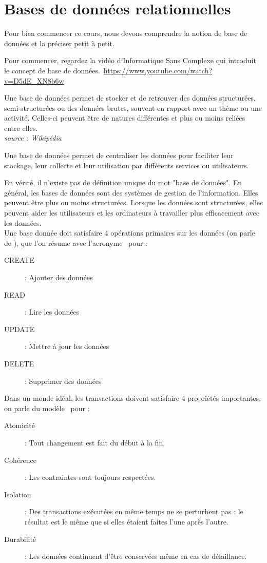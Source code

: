 \chapter*{Bases de données relationnelles}
\setcounter{chapter}{1}
Pour bien commencer ce cours, nous devons comprendre la notion de base de données et la préciser petit à petit.
\begin{Comprendre}Pour commencer, regardez la vidéo d'Informatique Sans Complexe qui introduit le concept de base de données.~\url{https://www.youtube.com/watch?v=D5dE_XN8b6w}
\end{Comprendre}
\begin{Definition}
Une base de données permet de stocker et de retrouver des données structurées, semi-structurées ou des données brutes, souvent en rapport avec un thème ou une activité. Celles-ci peuvent être de natures différentes et plus ou moins reliées entre elles.\\
\textit{source : Wikipédia}
\end{Definition}

Une base de données permet de centraliser les données pour faciliter leur stockage, leur collecte et leur utilisation par différents services ou utilisateurs.

En vérité, il n'existe pas de définition unique du mot "base de données". En général, les bases de données sont des systèmes de gestion de l'information. Elles peuvent être plus ou moins structurées. Lorsque les données sont structurées, elles peuvent aider les utilisateurs et les ordinateurs à travailler plus efficacement avec les données. \\
Une base donnée doit satisfaire 4 opérations primaires sur les données (on parle de ), que l'on résume avec l'acronyme~ pour :
\begin{center}
\begin{description}
    \item[CREATE] : Ajouter des données
    \item[READ] : Lire les données
    \item[UPDATE] : Mettre à jour les données
    \item[DELETE] : Supprimer des données
\end{description}
\end{center}
Dans un monde idéal, les transactions doivent satisfaire 4 propriétés importantes, on parle du modèle~ pour :
\begin{description}
    \item[Atomicité] : Tout changement est fait du début à la fin.
    \item[Cohérence] : Les contraintes sont toujours respectées.
    \item[Isolation] : Des transactions exécutées en même temps ne se perturbent pas : le résultat est le même que si elles étaient faites l'une après l'autre.
    \item[Durabilité] : Les données continuent d'être conservées même en cas de défaillance.
\end{description}
%


